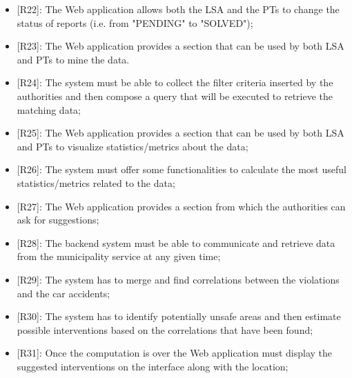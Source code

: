 \begin{itemize}
\begin{itemize}
    \end{itemize}
    \item {[R22]}: The Web application allows both the LSA and the PTs to change the status of reports (i.e. from "PENDING" to "SOLVED");
    \item {[R23]}: The Web application provides a section that can be used by both LSA and PTs to mine the data.
    \item {[R24]}: The system must be able to collect the filter criteria inserted by the authorities and then compose a query that will be executed to retrieve the matching data;
    \item {[R25]}: The Web application provides a section that can be used by both LSA and PTs to visualize statistics/metrics about the data;
    \item {[R26]}: The system must offer some functionalities to calculate the most useful statistics/metrics related to the data;
    \item {[R27]}: The Web application provides a section from which the authorities can ask for suggestions;
    \item {[R28]}: The backend system must be able to communicate and retrieve data from the municipality service at any given time;
    \item {[R29]}: The system has to merge and find correlations between the violations and the car accidents;
    \item {[R30]}: The system has to identify potentially unsafe areas and then estimate possible interventions based on the correlations that have been found;
    \item {[R31]}: Once the computation is over the Web application must display the suggested interventions on the interface along with the location;
\end{itemize}
